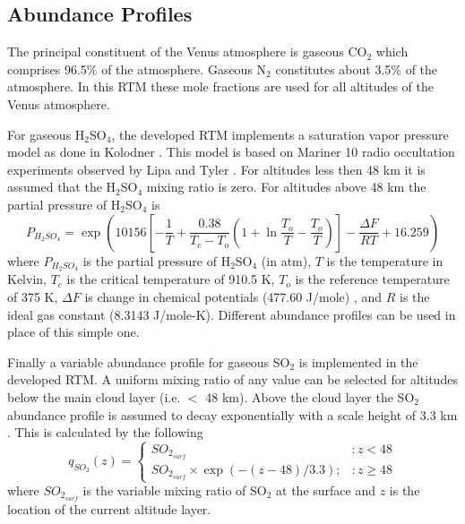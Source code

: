\subsection{Abundance Profiles}
The principal constituent of the Venus atmosphere is gaseous CO$_2$ which comprises 96.5\% of the atmosphere. Gaseous N$_2$ constitutes about 3.5\% of the atmosphere. In this RTM these mole fractions are used for all altitudes of the Venus atmosphere. 

For gaseous H$_2$SO$_4$, the developed RTM implements a saturation vapor pressure model as done in Kolodner \cite{Kolodner-thesis}. This model is based on Mariner 10 radio occultation experiments observed by Lipa and Tyler \cite{Lipa-1979}. For altitudes less then 48 km it is assumed that the H$_2$SO$_4$ mixing ratio is zero. For altitudes above 48 km the partial pressure of H$_2$SO$_4$ is
\begin{equation}
P_{H_2SO_4} = \exp\left(10156\left[ -\frac{1}{T}+ \frac{0.38}{T_c-T_o}\left(1+\ln\frac{T_o}{T} - \frac{T_o}{T}\right) \right] - \frac{\Delta F}{R T} + 16.259 \right)
\end{equation}
where $P_{H_2SO_4}$ is the partial pressure of H$_2$SO$_4$ (in atm), $T$ is the temperature in Kelvin, $T_c$ is the critical temperature of 910.5 K, $T_o$ is the reference temperature of 375 K, $\Delta F$ is change in chemical potentials (477.60 J/mole) \cite{Giauque-1960}, and $R$ is the ideal gas constant (8.3143 J/mole-K). Different abundance profiles can be used in place of this simple one. %

Finally a variable abundance profile for gaseous SO$_2$ is implemented in the developed RTM. A uniform mixing ratio of any value can be selected for altitudes below the main cloud layer (i.e. $<$ 48 km). Above the cloud layer the SO$_2$ abundance profile is assumed to decay exponentially with a scale height of 3.3 km \cite{Na-1994}. This is calculated by the following
\begin{equation}
q_{SO_2}(z) = \left\{
     \begin{array}{lr}
       SO_{2_{surf}} & : z < 48\\
       SO_{2_{surf}}\times\exp(-(z-48)/3.3); & : z\geq 48
     \end{array}
   \right.
\end{equation}
where $SO_{2_{surf}}$ is the variable mixing ratio of SO$_2$ at the surface and $z$ is the location of the current altitude layer.


